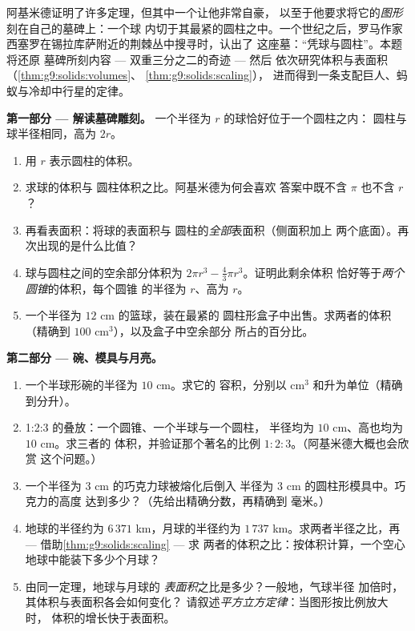 \begin{problem}
\label{pb:g9:solids:1}
阿基米德证明了许多定理，但其中一个让他非常自豪，
以至于他要求将它的\emph{图形}刻在自己的墓碑上：一个球
内切于其最紧的圆柱之中。一个世纪之后，罗马作家
西塞罗在锡拉库萨附近的荆棘丛中搜寻时，认出了
这座墓：“凭球与圆柱”。本题将还原
墓碑所刻内容 --- 双重三分之二的奇迹 --- 然后
依次研究体积与表面积（\cref{thm:g9:solids:volumes}、
\cref{thm:g9:solids:scaling}），
进而得到一条支配巨人、蚂蚁与冷却中行星的定律。

\medskip
\noindent\textbf{第一部分 --- 解读墓碑雕刻。}
一个半径为 $r$ 的球恰好位于一个圆柱之内：
圆柱与球半径相同，高为 $2r$。
\begin{enumerate}
  \item 用 $r$ 表示圆柱的体积。
  \item 求球的体积与
        圆柱体积之比。阿基米德为何会喜欢
        答案中既不含 $\pi$ 也不含 $r$？
  \item 再看表面积：将球的表面积与
        圆柱的\emph{全部}表面积（侧面积加上
        两个底面）。再次出现的是什么比值？
  \item 球与圆柱之间的空余部分体积为
        $2\pi r^3 - \frac43\pi r^3$。证明此剩余体积
        恰好等于\emph{两个圆锥}的体积，每个圆锥
        的半径为 $r$、高为 $r$。
  \item 一个半径为 $12$ cm 的篮球，装在最紧的
        圆柱形盒子中出售。求两者的体积（精确到
        $100$ cm$^3$），以及盒子中空余部分
        所占的百分比。
\end{enumerate}

\medskip
\noindent\textbf{第二部分 --- 碗、模具与月亮。}
\begin{enumerate}[resume]
  \item 一个半球形碗的半径为 $10$ cm。求它的
        容积，分别以 cm$^3$ 和升为单位（精确到分升）。
  \item 1:2:3 的叠放：一个圆锥、一个半球与一个圆柱，
        半径均为 $10$ cm、高也均为 $10$ cm。求三者的
        体积，并验证那个著名的比例
        $1 : 2 : 3$。（阿基米德大概也会欣赏
        这个问题。）
  \item 一个半径为 $3$ cm 的巧克力球被熔化后倒入
        半径为 $3$ cm 的圆柱形模具中。巧克力的高度
        达到多少？（先给出精确分数，再精确到
        毫米。）
  \item 地球的半径约为 $6\,371$ km，月球的半径约为
        $1\,737$ km。求两者半径之比，再
        --- 借助\cref{thm:g9:solids:scaling} --- 求
        两者的体积之比：按体积计算，一个空心
        地球中能装下多少个月球？
  \item 由同一定理，地球与月球的
        \emph{表面积}之比是多少？一般地，气球半径
        加倍时，其体积与表面积各会如何变化？
        请叙述\emph{平方立方定律}：当图形按比例放大时，
        体积的增长快于表面积。
\end{enumerate}


\end{problem}
